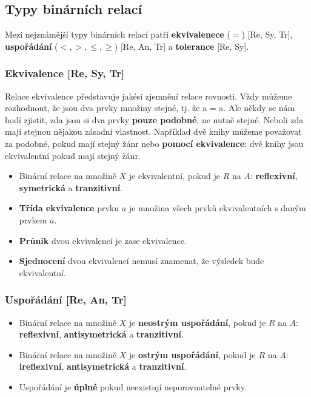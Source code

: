\subsection{Typy binárních relací}
Mezi nejznámější typy binárních relací patří \textbf{ekvivalenece} ($=$) [Re, Sy, Tr], \textbf{uspořádání} ($ <, >, \leq, \geq $) [Re, An, Tr] a \textbf{tolerance} [Re, Sy].

\subsubsection{Ekvivalence [Re, Sy, Tr]}
Relace ekvivalence představuje jakési zjemnění relace rovnosti. Vždy můžeme rozhodnout, že jsou dva prvky množiny stejné, tj. že a = a. Ale někdy se nám hodí zjistit, zda jsou si dva prvky \textbf{pouze podobné}, ne nutně stejné. Neboli zda mají stejnou nějakou zásadní vlastnost. Například dvě knihy můžeme považovat za podobné, pokud mají stejný žánr nebo \textbf{pomocí ekvivalence}: dvě knihy jsou ekvivalentní pokud mají stejný žánr.

\begin{itemize}
\item Binární relace na množině $ X $ je ekvivalentní, pokud je $ R $ na $A$: \textbf{reflexivní}, \textbf{symetrická} a \textbf{tranzitivní}.
\item \textbf{Třída ekvivalence} prvku $ a $ je množina všech prvků ekvivalentních s daným prvkem $ a $.
\item \textbf{Průnik} dvou ekvivalencí je zase ekvivalence.
\item \textbf{Sjednocení} dvou ekvivalencí nemusí znamenat, že výsledek bude ekvivalentní.
\end{itemize}

\subsubsection{Uspořádání [Re, An, Tr]}
\begin{itemize}
\item Binární relace na množině $ X $ je \textbf{neostrým uspořádání}, pokud je $ R $ na $A$: \textbf{reflexivní}, \textbf{antisymetrická} a \textbf{tranzitivní}.
\item Binární relace na množině $ X $ je \textbf{ostrým uspořádání}, pokud je $ R $ na $A$: \textbf{ireflexivní}, \textbf{antisymetrická} a \textbf{tranzitivní}.
\item Uspořádání je \textbf{úplné} pokud neexistují neporovnatelné prvky.
\end{itemize}
